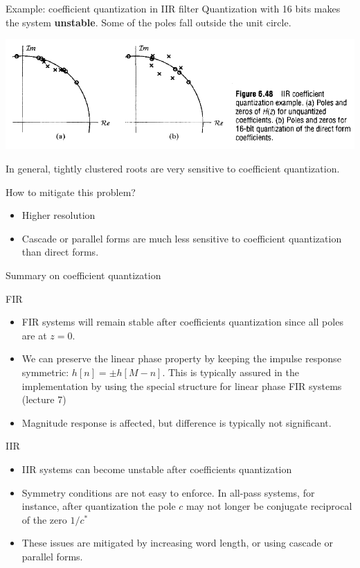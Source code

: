 \documentclass[10pt]{beamer}
\begin{document}
\begin{frame}{Example: coefficient quantization in IIR filter}	
Quantization with 16 bits makes the system \textbf{unstable}. Some of the poles fall outside the unit circle.
\begin{center}
\includegraphics[width=\textwidth]{figs/iir_coeff_quantiz.png}
\end{center}	

\pause
In general, tightly clustered roots are very sensitive to coefficient quantization.

How to mitigate this problem?
\begin{itemize}
\item Higher resolution
\item Cascade or parallel forms are much less sensitive to coefficient quantization than direct forms.
\end{itemize}
\end{frame}


\begin{frame}{Summary on coefficient quantization}
\begin{block}{FIR}
	\begin{itemize}
		\item FIR systems will remain stable after coefficients quantization since all poles are at $z = 0$.
		\item We can preserve the linear phase property by keeping the impulse response symmetric: $h[n] = \pm h[M-n]$. This is typically assured in the implementation by using the special structure for linear phase FIR systems (lecture 7)
		\item Magnitude response is affected, but difference is typically not significant.
	\end{itemize}
\end{block}

\begin{block}{IIR}
	\begin{itemize}
		\item IIR systems can become unstable after coefficients quantization
		\item Symmetry conditions are not easy to enforce. In all-pass systems, for  instance, after quantization the pole $c$ may not longer be conjugate reciprocal of the zero $1/c^*$
		\item These issues are mitigated by increasing word length, or using cascade or parallel forms.
	\end{itemize}
\end{block}

\end{frame}
\end{document}
